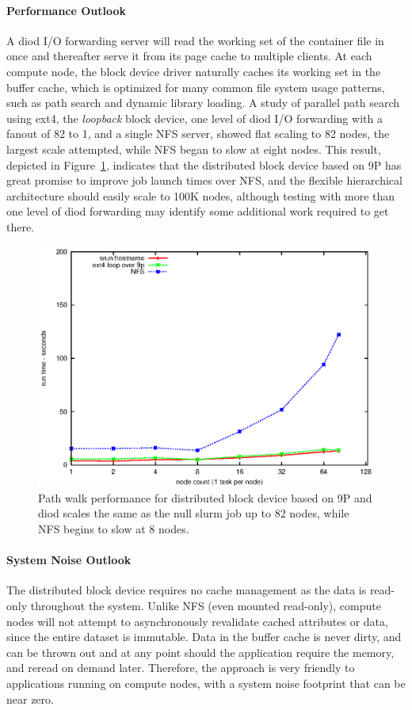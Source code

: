 \paragraph{Performance Outlook}
A diod I/O forwarding server will read the working set of the container
file in once and thereafter serve it from its page cache to multiple clients.
At each compute node,
the block device driver naturally caches its working set in the buffer cache,
which is optimized for many common file system usage patterns,
such as path search and dynamic library loading.
A study of parallel path search\cite{BlkDevPathSearch}
using ext4, the {\em loopback} block device, one level of diod I/O forwarding
with a fanout of 82 to 1, and a single NFS server,
showed flat scaling to 82 nodes, the largest scale attempted,
while NFS began to slow at eight nodes.
This result, depicted in Figure~\ref{FigPathWalk},
indicates that the distributed block device based on 9P has
great promise to improve job launch times over NFS, and the flexible
hierarchical architecture should easily scale to 100K nodes, although
testing with more than one level of diod forwarding may identify some
additional work required to get there.
\begin{figure}
\centering
\includegraphics[scale=1]{../fig/pathwalk.eps}
\caption{
Path walk performance for distributed block device based on 9P and diod
scales the same as the null slurm job up to 82 nodes, while NFS begins
to slow at 8 nodes.
}
\label{FigPathWalk}
\end{figure}

\paragraph{System Noise Outlook}
The distributed block device requires no cache management as the
data is read-only throughout the system.  Unlike NFS (even mounted read-only),
compute nodes will not attempt to asynchronously revalidate cached
attributes or data, since the entire dataset is immutable.
Data in the buffer cache is never dirty, and can be thrown out and at
any point should the application require the memory, and reread on demand later.
Therefore, the approach is very friendly to applications running on compute
nodes, with a system noise footprint that can be near zero.

